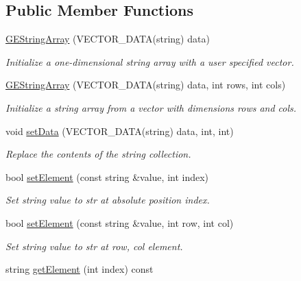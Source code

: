 \subsection*{Public Member Functions}
\begin{DoxyCompactItemize}
\item 
\hyperlink{class_g_e_string_array_a1ef29169e2bfc2fcd89619f127ef969f}{G\-E\-String\-Array} (V\-E\-C\-T\-O\-R\-\_\-\-D\-A\-T\-A(string) data)
\begin{DoxyCompactList}\small\item\em Initialize a one-\/dimensional string array with a user specified vector. \end{DoxyCompactList}\item 
\hyperlink{class_g_e_string_array_aa662f3f9a8cc261544e8a38c1e4955b5}{G\-E\-String\-Array} (V\-E\-C\-T\-O\-R\-\_\-\-D\-A\-T\-A(string) data, int rows, int cols)
\begin{DoxyCompactList}\small\item\em Initialize a string array from a vector with dimensions {\itshape rows} and {\itshape cols}. \end{DoxyCompactList}\item 
void \hyperlink{class_g_e_string_array_aea264a7ca7c1e81b4e2aaa8a45dd99d7}{set\-Data} (V\-E\-C\-T\-O\-R\-\_\-\-D\-A\-T\-A(string) data, int, int)
\begin{DoxyCompactList}\small\item\em Replace the contents of the string collection. \end{DoxyCompactList}\item 
bool \hyperlink{class_g_e_string_array_ac8731099a1d1a09a6a3fce0bc9495dfb}{set\-Element} (const string \&value, int index)
\begin{DoxyCompactList}\small\item\em Set string value to {\itshape str} at absolute position {\itshape index}. \end{DoxyCompactList}\item 
bool \hyperlink{class_g_e_string_array_ad546d10de2a18ecb393abe6e4e0ff3ec}{set\-Element} (const string \&value, int row, int col)
\begin{DoxyCompactList}\small\item\em Set string value to {\itshape str} at {\itshape row}, {\itshape col} element. \end{DoxyCompactList}\item 
string \hyperlink{class_g_e_string_array_a4017953d19ac1353f4a96abc1d461730}{get\-Element} (int index) const 

\end{DoxyCompactItemize}
